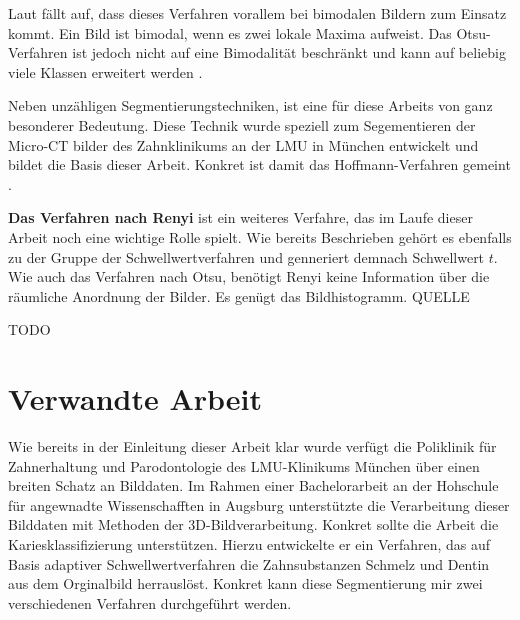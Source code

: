 Laut \citet[Seite264]{lehmann2013bildverarbeitung} fällt auf, dass dieses
Verfahren vorallem bei bimodalen Bildern zum Einsatz kommt. Ein Bild ist bimodal,
wenn es zwei lokale Maxima aufweist. Das Otsu-Verfahren ist jedoch nicht auf eine
Bimodalität beschränkt und kann auf beliebig viele Klassen erweitert werden \citep[vgl.][Seite264]{lehmann2013bildverarbeitung}.

Neben unzähligen Segmentierungstechniken, ist eine für diese Arbeits von ganz
besonderer Bedeutung. Diese Technik wurde speziell zum Segementieren der Micro-CT
bilder des Zahnklinikums an der LMU in München entwickelt und bildet die Basis dieser
Arbeit. Konkret ist damit das Hoffmann-Verfahren gemeint \citep[vgl.][]{hoffmann2020}.


\textbf{Das Verfahren nach Renyi} ist ein weiteres Verfahre, das im Laufe dieser Arbeit
noch eine wichtige Rolle spielt. Wie bereits Beschrieben gehört es ebenfalls zu der
Gruppe der Schwellwertverfahren und genneriert demnach Schwellwert $t$. Wie auch das
Verfahren nach Otsu, benötigt Renyi keine Information über die räumliche Anordnung der
Bilder. Es genügt das Bildhistogramm. QUELLE

TODO

\pagebreak

\section{Verwandte Arbeit}
\label{sec:verwwandte_arbeit} Wie bereits in der Einleitung dieser Arbeit klar wurde
verfügt die Poliklinik für Zahnerhaltung und Parodontologie des LMU-Klinikums München
über einen breiten Schatz an Bilddaten. Im Rahmen einer Bachelorarbeit an der
Hohschule für angewnadte Wissenschafften in Augsburg unterstützte \citet{hoffmann2020}
die Verarbeitung dieser Bilddaten mit Methoden der 3D-Bildverarbeitung. Konkret
sollte die Arbeit die Kariesklassifizierung unterstützen. Hierzu entwickelte er ein
Verfahren, das auf Basis adaptiver Schwellwertverfahren die Zahnsubstanzen
Schmelz und Dentin aus dem Orginalbild herrauslöst. Konkret kann diese Segmentierung
mir zwei verschiedenen Verfahren durchgeführt werden.

